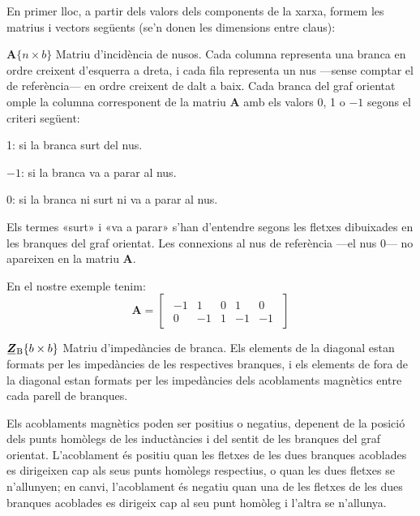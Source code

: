 En primer lloc, a partir dels valors dels components de la xarxa, formem les matrius i vectors següents (se'n donen les  dimensions entre claus):
\begin{list}{}
{\setlength{\labelwidth}{20mm} \setlength{\leftmargin}{20mm} \setlength{\labelsep}{2mm}}
   \item[$\boldsymbol{A}\{n\times b\}$] Matriu d'incidència de nusos. Cada columna representa una branca en ordre creixent d'esquerra a dreta, i cada fila representa un nus ---sense comptar el de referència--- en ordre creixent de dalt a baix. Cada branca del graf orientat omple la columna corresponent de la matriu $\boldsymbol{A}$ amb els valors 0, 1 o $-1$ segons el criteri següent:
   \begin{list}{}
   {\setlength{\labelwidth}{7mm} \setlength{\leftmargin}{9mm} \setlength{\labelsep}{2mm}}
      \item[1:]  si la branca surt del nus.
      \item[$-1$:] si la branca va a parar al nus.
      \item[0:]  si la branca ni surt ni va a parar al nus.
   \end{list}
   Els termes «surt» i «va a parar» s'han d'entendre segons les fletxes dibuixades en les branques del graf orientat. Les connexions al nus de referència ---el nus 0--- no apareixen en la matriu $\boldsymbol{A}$.

   En el nostre exemple tenim:
   \[
      \boldsymbol{A} = 
      \begin{bmatrix}\begin{array}{rrrrr} 
      		-1 & 1  & 0 &  1 & 0 \\  0 & -1 & 1 & -1 & -1
      \end{array}\end{bmatrix}
   \]

   \item[$\mcmplx{Z}\ped{B}\{b\times b\}$] Matriu d'impedàncies de branca. Els elements de la diagonal estan formats per les impedàncies de les respectives branques, i els elements de fora de la diagonal estan formats per les impedàncies dels acoblaments magnètics entre cada parell de branques.

   Els acoblaments magnètics poden ser positius o negatius, depenent
    de la posició dels punts homòlegs de les inductàncies i del sentit
    de les branques del graf orientat. L'acoblament és positiu quan les
    fletxes de les dues branques acoblades es dirigeixen cap als seus punts
    homòlegs respectius, o quan les dues fletxes se n'allunyen; en canvi,
    l'acoblament és negatiu quan una de les fletxes de les dues branques
    acoblades es dirigeix cap al seu punt homòleg i l'altra se n'allunya.


\end{list}
